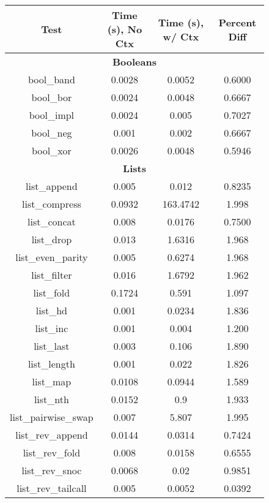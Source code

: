 \begin{figure}
  \begin{center}
  \tabcolsep 5.8pt
  \footnotesize
  \begin{tabular}{|c|c|c|c|}
  \hline
  \textbf{Test} & \textbf{Time (s), No Ctx} & \textbf{Time (s), w/ Ctx} & \textbf{Percent Diff} \\
  \hline

\multicolumn{4}{|c|}{\textbf{Booleans}} \\
\hline
bool\_band & 0.0028 & 0.0052 & 0.6000 \\
\hline
bool\_bor & 0.0024 & 0.0048 & 0.6667 \\
\hline
bool\_impl & 0.0024 & 0.005 & 0.7027 \\
\hline
bool\_neg & 0.001 & 0.002 & 0.6667 \\
\hline
bool\_xor & 0.0026 & 0.0048 & 0.5946 \\
\hline
\multicolumn{4}{|c|}{\textbf{Lists}} \\
\hline
list\_append & 0.005 & 0.012 & 0.8235 \\
\hline
list\_compress & 0.0932 & 163.4742 & 1.998 \\
\hline
list\_concat & 0.008 & 0.0176 & 0.7500 \\
\hline
list\_drop & 0.013 & 1.6316 & 1.968 \\
\hline
list\_even\_parity & 0.005 & 0.6274 & 1.968 \\
\hline
list\_filter & 0.016 & 1.6792 & 1.962 \\
\hline
list\_fold & 0.1724 & 0.591 & 1.097 \\
\hline
list\_hd & 0.001 & 0.0234 & 1.836 \\
\hline
list\_inc & 0.001 & 0.004 & 1.200 \\
\hline
list\_last & 0.003 & 0.106 & 1.890 \\
\hline
list\_length & 0.001 & 0.022 & 1.826 \\
\hline
list\_map & 0.0108 & 0.0944 & 1.589 \\
\hline
list\_nth & 0.0152 & 0.9 & 1.933 \\
\hline
list\_pairwise\_swap & 0.007 & 5.807 & 1.995 \\
\hline
list\_rev\_append & 0.0144 & 0.0314 & 0.7424 \\
\hline
list\_rev\_fold & 0.008 & 0.0158 & 0.6555 \\
\hline
list\_rev\_snoc & 0.0068 & 0.02 & 0.9851 \\
\hline
list\_rev\_tailcall & 0.005 & 0.0052 & 0.0392 \\

\end{tabular}
\end{center}
\end{figure}
